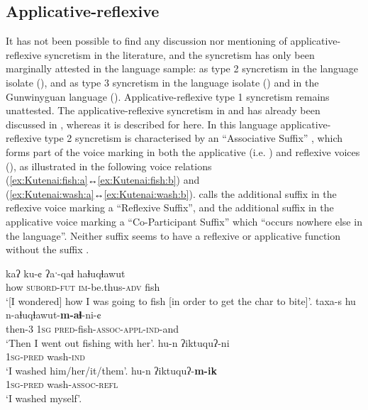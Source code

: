 \subsection{Applicative-reflexive} \label{sec:simple-syncretism:appl-refl}
It has not been possible to find any discussion nor mentioning of applicative-reflexive syncretism in the literature, and the syncretism has only been marginally attested in the language sample: as type 2 syncretism in the language isolate  (), and as type 3 syncretism in the language isolate  () and in the Gunwinyguan language  (). Applicative-reflexive type 1 syncretism remains unattested. The applicative-reflexive syncretism in  and  has already been discussed in , whereas it is described for  here. In this language applicative-reflexive type 2 syncretism is characterised by an “Associative Suffix”  \citep[209]{morgan:1991}, which forms part of the voice marking in both the applicative (i.e. ) and reflexive voices (), as illustrated in the following voice relations (\ref{ex:Kutenai:fish:a}↔\ref{ex:Kutenai:fish:b}) and (\ref{ex:Kutenai:wash:a}↔\ref{ex:Kutenai:wash:b}). \cite[313, 321]{morgan:1991} calls the additional suffix  in the reflexive voice marking a “Reflexive Suffix”, and the additional suffix  in the applicative voice marking a “Co-Participant Suffix” which “occurs nowhere else in the language”. Neither suffix seems to have a reflexive or applicative function without the suffix . 

\ea {} \citep[292, 313, 363, 381]{morgan:1991}
\ea\label{ex:Kutenai:fish:a}
	\gll	kaʔ ku-¢ ʔaˑ-qaɬ haɬuqɬawut \\
			how \textsc{subord-fut} \textsc{im}-be.thus-\textsc{adv} fish \\
	\glt	‘[I wondered] how I was going to fish [in order to get the char to bite]’. 
\ex\label{ex:Kutenai:fish:b}
	\gll	taxa-s hu n-aɬuqɬawut-\textbf{m-aɬ}-ni-¢ \\
			then-\textsc{3} \textsc{1sg} \textsc{pred}-fish-\textsc{assoc-appl-ind}-and \\
	\glt	‘Then I went out fishing with her’. 
\ex\label{ex:Kutenai:wash:a}
	\gll	hu-n ʔiktuquʔ-ni \\
			\textsc{1sg-pred} wash-\textsc{ind} \\
	\glt	‘I washed him/her/it/them’. 
\ex\label{ex:Kutenai:wash:b}
	\gll	hu-n ʔiktuquʔ-\textbf{m-ik} \\
			\textsc{1sg-pred} wash-\textsc{assoc-refl} \\
	\glt	‘I washed myself’. 
	\z 
\z

